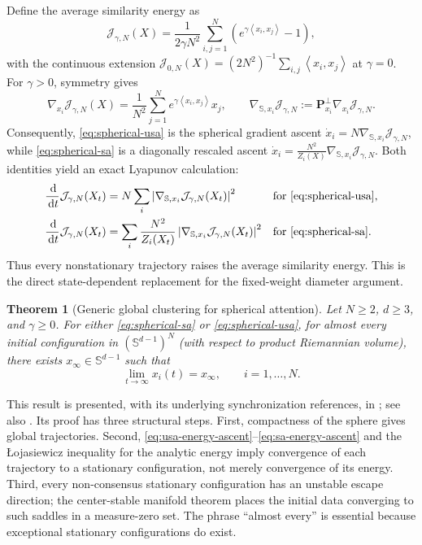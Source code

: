 \documentclass[11pt]{amsart}
\numberwithin{equation}{section}
\theoremstyle{plain}
\newtheorem{theorem}{Theorem}[section]
\newcommand{\dd}{\,\mathrm{d}}
\newcommand{\ip}[2]{\left\langle#1,#2\right\rangle}
\begin{document}
Define the average similarity energy as
\begin{equation}\label{eq:spherical-attention-energy}
 \mathcal J_{\gamma,N}(X)
 =\frac1{2\gamma N^2}\sum_{i,j=1}^N
 \left(e^{\gamma\ip{x_i}{x_j}}-1\right),
\end{equation}
with the continuous extension
$\mathcal J_{0,N}(X)=(2N^2)^{-1}\sum_{i,j}\ip{x_i}{x_j}$ at
$\gamma=0$.  For $\gamma>0$, symmetry gives
\[
 \nabla_{x_i}\mathcal J_{\gamma,N}(X)
 =\frac1{N^2}\sum_{j=1}^Ne^{\gamma\ip{x_i}{x_j}}x_j,
 \qquad
 \nabla_{\mathbb S,x_i}\mathcal J_{\gamma,N}
 :=\mathbf P_{x_i}^\perp\nabla_{x_i}\mathcal J_{\gamma,N}.
\]
Consequently, \eqref{eq:spherical-usa} is the spherical gradient ascent
$\dot x_i=N\nabla_{\mathbb S,x_i}\mathcal J_{\gamma,N}$, while
\eqref{eq:spherical-sa} is a diagonally rescaled ascent
$ \dot x_i=\frac{N^2}{Z_i(X)}
 \nabla_{\mathbb S,x_i}\mathcal J_{\gamma,N}$.
Both identities yield an exact Lyapunov calculation:
\begin{align}
 \frac{\dd}{\dd t}\mathcal J_{\gamma,N}(X_t)
 &=N\sum_i\left|\nabla_{\mathbb S,x_i}
 \mathcal J_{\gamma,N}(X_t)\right|^2
 &&\text{for \eqref{eq:spherical-usa}},
 \label{eq:usa-energy-ascent}\\
 \frac{\dd}{\dd t}\mathcal J_{\gamma,N}(X_t)
 &=\sum_i\frac{N^2}{Z_i(X_t)}
 \left|\nabla_{\mathbb S,x_i}
 \mathcal J_{\gamma,N}(X_t)\right|^2
 &&\text{for \eqref{eq:spherical-sa}}.
 \label{eq:sa-energy-ascent}
\end{align}
Thus every nonstationary trajectory raises the average similarity energy.
This is the direct state-dependent replacement for the fixed-weight diameter
argument.

\begin{theorem}[Generic global clustering for spherical attention]
\label{thm:spherical-attention-clustering}
Let $N\geq2$, $d\geq3$, and $\gamma\geq0$.  For either
\eqref{eq:spherical-sa} or \eqref{eq:spherical-usa}, for almost every initial
configuration in $(\mathbb S^{d-1})^N$
(with respect to product Riemannian volume), there exists
$x_\infty\in\mathbb S^{d-1}$ such that
\[
 \lim_{t\to\infty}x_i(t)=x_\infty,
 \qquad i=1,\ldots,N.
\]
\end{theorem}
This result is presented, with its underlying synchronization references, in
\cite{Rigollet2026MeanField}; see also
\cite{GeshkovskiEtAl2023Clusters}.  Its proof has three structural steps.
First, compactness of the sphere gives global trajectories.  Second,
\eqref{eq:usa-energy-ascent}--\eqref{eq:sa-energy-ascent} and the
{\L}ojasiewicz inequality for the analytic energy imply convergence of each
trajectory to a stationary configuration, not merely convergence of its
energy.  Third, every non-consensus stationary configuration has an unstable
escape direction; the center-stable manifold theorem places the initial data
converging to such saddles in a measure-zero set.  The phrase ``almost every''
is essential because exceptional stationary configurations do exist.
\end{document}
